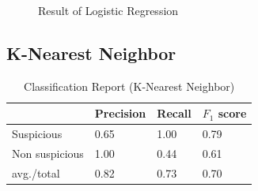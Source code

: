 \begin{figure}[H]
\centering
{}%
\hfill %
%
\caption{Result of Logistic Regression}
\label{flr}
\end{figure}



\subsection{\textbf{K-Nearest Neighbor}}
\renewcommand{\arraystretch}{1}
\begin{table}[h!]
\begin{center}
\caption{Classification Report (K-Nearest Neighbor)}
\begin{tabular}{|m{2.8cm} | m{1.5cm}| m{1.3cm}| m{1.5cm}|}
\hline
     & Precision & Recall & $F_1$ score\\
\hline
     Suspicious & 0.65 & 1.00 & 0.79\\
\hline 
     Non suspicious  & 1.00 & 0.44 & 0.61\\
\hline 
     avg./total & 0.82 & 0.73 & 0.70\\
\hline
\end{tabular}
\label{tknn}
\end{center}
\end{table}


